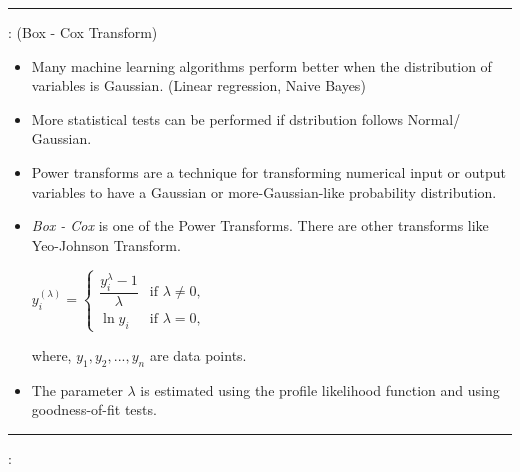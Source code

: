 \documentclass[	DIV=calc,%
paper=a4,%
fontsize=11pt,%
twocolumn]{scrartcl} %
\newcommand{\hformbar}[1]{\vspace{5pt}\hrule\vspace{10pt}} %
\newcommand{\formdesc}[1]{\noindent\textbf{#1}}
\begin{document}
\hformbar

\formdesc{Power Transform}: (Box - Cox Transform)

\begin{itemize}
	\item Many machine learning algorithms perform better when the distribution of variables is Gaussian. (Linear regression, Naive Bayes)
	\item More statistical tests can be performed if dstribution follows Normal/ Gaussian.
	\item Power transforms are a technique for transforming numerical input or output variables to have a Gaussian or more-Gaussian-like probability distribution.
	\item \emph{Box - Cox} is one of the Power Transforms. There are other transforms like Yeo-Johnson Transform.
	
	\begin{math}
		{\displaystyle y_{i}^{(\lambda )}={\begin{cases}{\dfrac {y_{i}^{\lambda }-1}{\lambda }}&{\text{if }}\lambda \neq 0,\\\ln y_{i}&{\text{if }}\lambda =0,\end{cases}}}
	\end{math}

where,
$y_1, y_2,..., y_n$ are data points.

	\item The parameter $\lambda$ is estimated using the profile likelihood function and using goodness-of-fit tests.
 
\end{itemize}


\hformbar

\formdesc{Co-Variance}:
\end{document}
